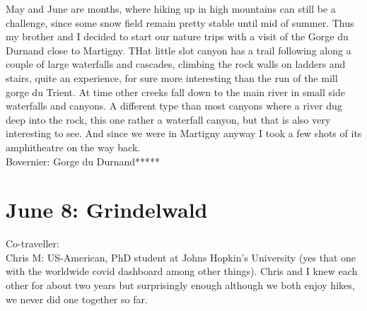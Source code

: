 May and June are months, where hiking up in high mountains can still be a challenge, since some snow field remain pretty stable until mid of summer. Thus my brother and I decided to start our nature trips with a visit of the Gorge du Durnand close to Martigny. THat little slot canyon has a trail following along a couple of large waterfalls and cascades, climbing the rock walls on ladders and stairs, quite an experience, for sure more interesting than the run of the mill gorge du Trient. At time other creeks fall down to the main river in small side waterfalls and canyons. A different type than most canyons where a river dug deep into the rock, this one rather a waterfall canyon, but that is also very interesting to see. And since we were in Martigny anyway I took a few shots of its amphitheatre on the way back.\\

Bovernier: Gorge du Durnand*****

\section{June 8: Grindelwald}
\label{Grindelwald2014}

Co-traveller:\\
Chris M: US-American, PhD student at Johns Hopkin's University (yes that one with the worldwide covid dashboard among other things). Chris and I knew each other for about two years but surprisingly enough although we both enjoy hikes, we never did one together so far. \\

